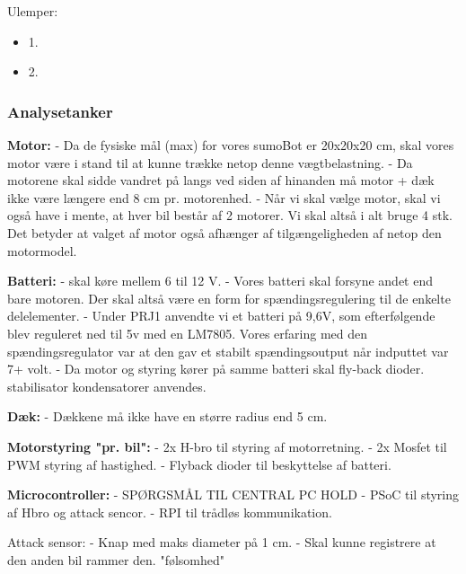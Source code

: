 Ulemper: 
\begin{itemize}
\item 1.
\item 2.
\end{itemize}



\subsubsection{Analysetanker}



\textbf{Motor:}
- Da de fysiske mål (max) for vores sumoBot er 20x20x20 cm, skal vores motor være i stand til at kunne trække netop denne vægtbelastning.
- Da motorene skal sidde vandret på langs ved siden af hinanden må motor + dæk ikke være længere end 8 cm pr. motorenhed.
- Når vi skal vælge motor, skal vi også have i mente, at hver bil består af 2 motorer. Vi skal altså i alt bruge 4 stk. Det betyder at valget af motor også afhænger af tilgængeligheden af netop den motormodel.

\textbf{Batteri:}
- skal køre mellem 6 til 12 V.
- Vores batteri skal forsyne andet end bare motoren. Der skal altså være en form for spændingsregulering til de enkelte delelementer.
- Under PRJ1 anvendte vi et batteri på 9,6V, som efterfølgende blev reguleret ned til 5v med en LM7805. Vores erfaring med den spændingsregulator var at den gav et stabilt spændingsoutput når indputtet var 7+ volt.
- Da motor og styring kører på samme batteri skal fly-back dioder. stabilisator kondensatorer anvendes. 

\textbf{Dæk:}
- Dækkene må ikke have en større radius end 5 cm.

\textbf{Motorstyring "pr. bil":}
- 2x H-bro til styring af motorretning.
- 2x Mosfet til PWM styring af hastighed.
- Flyback dioder til beskyttelse af batteri.


\textbf{Microcontroller:} - SPØRGSMÅL TIL CENTRAL PC HOLD
- PSoC til styring af Hbro og attack sencor.
- RPI til trådløs kommunikation.

Attack sensor:
- Knap med maks diameter på 1 cm.
- Skal kunne registrere at den anden bil rammer den. "følsomhed"

